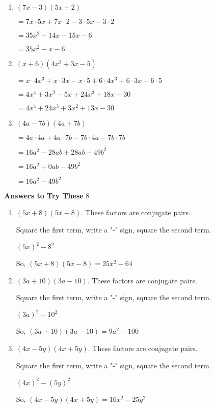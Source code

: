 \documentclass[a4paper]{JAC2003}
\begin{document}
\begin{enumerate}
\item $(7 x-3)(5 x+2)$

$= 7 x \cdot 5 x+7 x \cdot 2-3 \cdot 5 x-3 \cdot 2$

$= 35 x^{2}+14 x-15 x-6$

$= 35 x^{2}-x-6$


\item $(x+6)\left(4 x^{3}+3 x-5\right)$

$=x \cdot 4 x^{3}+x \cdot 3 x-x \cdot 5+6 \cdot 4 x^{3}+6 \cdot 3 x-6 \cdot 5$

$=4 x^{4}+3 x^{2}-5 x+24 x^{3}+18 x-30$

$=4 x^{4}+24 x^{3}+3 x^{2}+13 x-30$

\item $(4 a-7 b)(4 a+7 b)$

$=4 a \cdot 4 a+4 a \cdot 7 b-7 b \cdot 4 a-7 b \cdot 7 b$

$=16 a^{2}-28 a b+28 a b-49 b^{2}$

$=16 a^{2}+0 a b-49 b^{2}$

$=16 a^{2}-49 b^{2}$
\end{enumerate}


\noindent\textcolor{red!75!black}{\textbf{Answers to Try These}} 8
\begin{enumerate}
\item $(5 x+8)(5 x-8)$. These factors are conjugate pairs.

Square the first term, write a "-" sign, square the second term.

$(5 x)^{2}-8^{2}$

So, $(5 x+8)(5 x-8)=25 x^{2}-64$

\item $(3 a+10)(3 a-10)$. These factors are conjugate pairs.

Square the first term, write a "-" sign, square the second term.

$(3 a)^{2}-10^{2}$

So, $(3 a+10)(3 a-10)=9 a^{2}-100$

\item $(4 x-5 y)(4 x+5 y)$. These factors are conjugate pairs.

Square the first term, write a "-" sign, square the second term.

$(4 x)^{2}-(5 y)^{2}$

So, $(4 x-5 y)(4 x+5 y)=16 x^{2}-25 y^{2}$
\end{enumerate}
\end{document}
